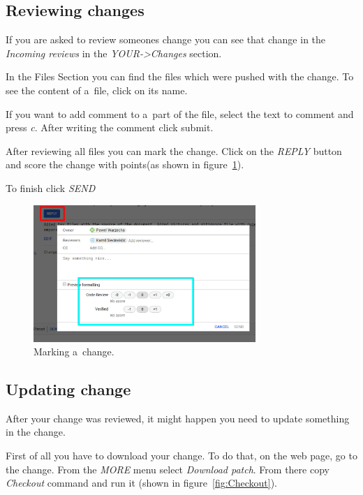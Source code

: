\documentclass{article}
\begin{document}
\subsection{Reviewing changes}

If you are asked to review someones change you can see that change in the \textit{Incoming reviews} in the \textit{YOUR->Changes} section.

In the Files Section you can find the files which were pushed with the change. To see the content of a~file, click on its name.

If you want to add comment to a~part of the file, select the text to comment and press \textit{c}. After writing the comment click submit.

After reviewing all files you can mark the change. Click on the \textit{REPLY} button and score the change with points(as shown in figure~\ref{fig:Marking}).

To finish click \textit{SEND}

\begin{figure}[!ht]
  \centering
  \includegraphics[width=0.75\textwidth]{img/Marking}
  \caption{Marking a~change.}
  \label{fig:Marking}
\end{figure}

\newpage

\subsection{Updating change}

After your change was reviewed, it might happen you need to update something in the change. 

First of all you have to download your change. To do that, on the web page, go to the change. From the \textit{MORE} menu select \textit{Download patch}. From there copy \textit{Checkout} command and run it (shown in figure~\ref{fig:Checkout}).
\end{document}
